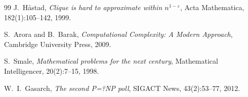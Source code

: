 \documentclass[12pt,a4paper]{amsart}
\theoremstyle{definition}
\begin{document}
\begin{thebibliography}{99}
J.~H{\aa}stad,
\textit{Clique is hard to approximate within $n^{1-\varepsilon}$},
Acta Mathematica, 182(1):105--142, 1999.

S.~Arora and B.~Barak,
\textit{Computational Complexity: A Modern Approach},
Cambridge University Press, 2009.

S.~Smale,
\textit{Mathematical problems for the next century},
Mathematical Intelligencer, 20(2):7--15, 1998.

W.~I.\ Gasarch,
\textit{The second P=?NP poll},
SIGACT News, 43(2):53--77, 2012.

\end{thebibliography}
\end{document}
